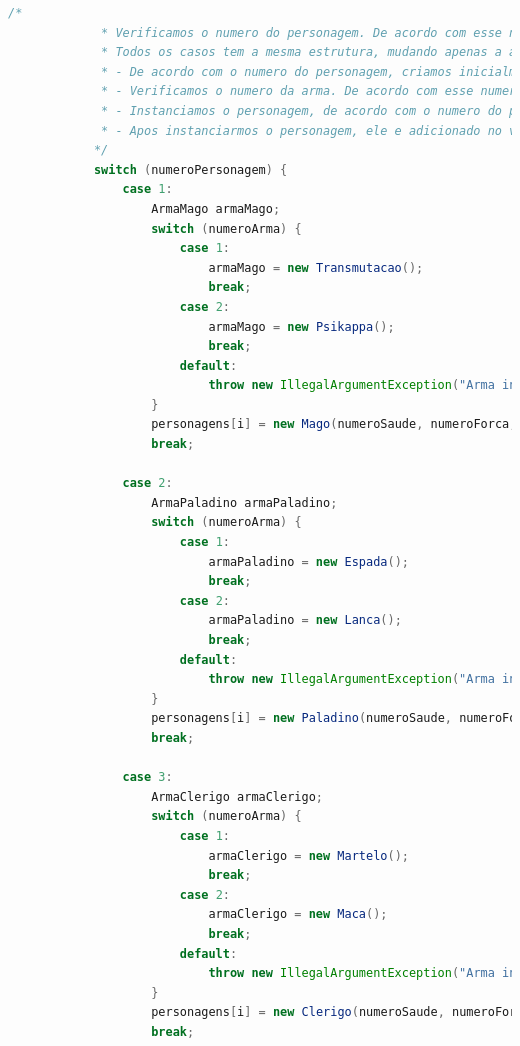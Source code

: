 \documentclass[11pt]{uiobrev}
\begin{document}
\begin{lstlisting}[language=Java, caption={Codigo Principal do Programa}]
            /*
             * Verificamos o numero do personagem. De acordo com esse numero, ele entrara em um dos casos. Caso o numero seja diferente de 1, 2 ou 3 uma excecao sera lancada.
             * Todos os casos tem a mesma estrutura, mudando apenas a arma de acordo com o personagem. Segue a estrutura:
             * - De acordo com o numero do personagem, criamos inicialmente uma variavel do tipo da arma do personagem.
             * - Verificamos o numero da arma. De acordo com esse numero, instanciamos a arma do personagem. Caso o numero seja diferente de 1 ou 2, uma excecao sera lancada.
             * - Instanciamos o personagem, de acordo com o numero do personagem, passando os valores de saude, forca, destreza e a arma.
             * - Apos instanciarmos o personagem, ele e adicionado no vetor de personagens.
            */
            switch (numeroPersonagem) {
                case 1:
                    ArmaMago armaMago;
                    switch (numeroArma) {
                        case 1:
                            armaMago = new Transmutacao();
                            break;
                        case 2:
                            armaMago = new Psikappa();
                            break;
                        default:
                            throw new IllegalArgumentException("Arma invalida para Mago.");
                    }
                    personagens[i] = new Mago(numeroSaude, numeroForca, numeroDestreza, armaMago);
                    break;

                case 2:
                    ArmaPaladino armaPaladino;
                    switch (numeroArma) {
                        case 1:
                            armaPaladino = new Espada();
                            break;
                        case 2:
                            armaPaladino = new Lanca();
                            break;
                        default:
                            throw new IllegalArgumentException("Arma invalida para Paladino.");
                    }
                    personagens[i] = new Paladino(numeroSaude, numeroForca, numeroDestreza, armaPaladino);
                    break;

                case 3:
                    ArmaClerigo armaClerigo;
                    switch (numeroArma) {
                        case 1:
                            armaClerigo = new Martelo();
                            break;
                        case 2:
                            armaClerigo = new Maca();
                            break;
                        default:
                            throw new IllegalArgumentException("Arma invalida para Clerigo.");
                    }
                    personagens[i] = new Clerigo(numeroSaude, numeroForca, numeroDestreza, armaClerigo);
                    break;


\end{lstlisting}
\end{document}
